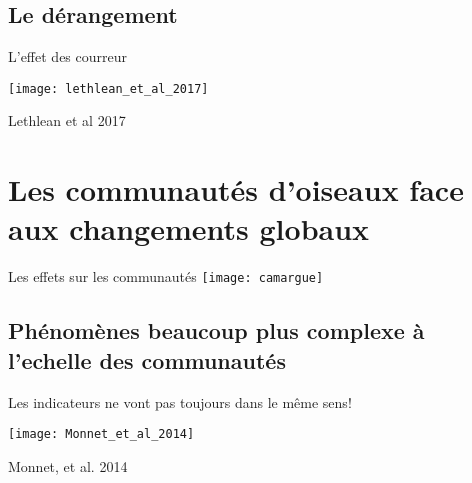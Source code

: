 \documentclass[10pt]{beamer}
\begin{document}
\subsection{Le dérangement}

\begin{frame}{L'effet des courreur}

       \begin{center}
     \texttt{[image: lethlean\_et\_al\_2017]}
   
      \end{center}
       \begin{tiny}
      \vspace{10pt}
        Lethlean et al 2017

  \end{tiny}
 \end{frame}

 \section[Les effets sur les communautés]{Les communautés d'oiseaux face aux changements globaux}


\begin{frame} {Les effets sur les communautés}
 \texttt{[image: camargue]}
\end{frame}



\subsection{Phénomènes beaucoup plus complexe à l'echelle des communautés}

\begin{frame}{Les indicateurs ne vont pas toujours dans le même sens!}
 \begin{center}
   \texttt{[image: Monnet\_et\_al\_2014]}
 \end{center}

 \begin{tiny}
    Monnet, et al. 2014
  \end{tiny}
\end{frame}
\end{document}
